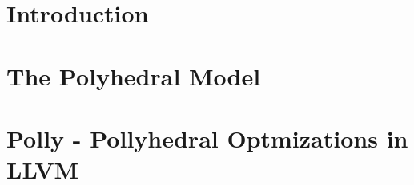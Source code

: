 \documentclass[MTech]{iitmdiss}
\begin{document}
\pagebreak


 
 
 \pagebreak
 \clearpage


 \chapter{Introduction}


 \chapter{The Polyhedral Model}


%

\chapter{Polly - Pollyhedral Optmizations in LLVM}


\end{document}
